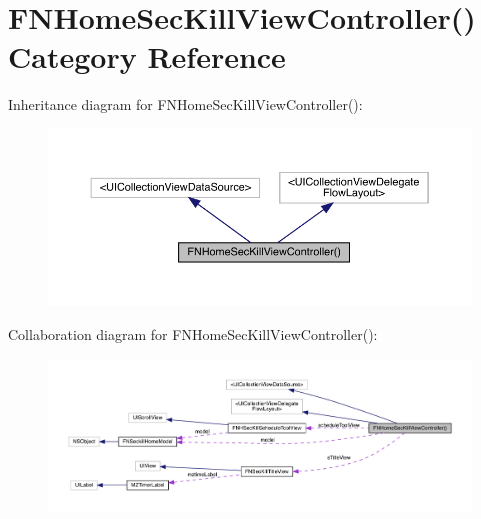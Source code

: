 \hypertarget{category_f_n_home_sec_kill_view_controller_07_08}{}\section{F\+N\+Home\+Sec\+Kill\+View\+Controller() Category Reference}
\label{category_f_n_home_sec_kill_view_controller_07_08}


Inheritance diagram for F\+N\+Home\+Sec\+Kill\+View\+Controller()\+:\nopagebreak
\begin{figure}[H]
\begin{center}
\leavevmode
\includegraphics[width=350pt]{category_f_n_home_sec_kill_view_controller_07_08__inherit__graph}
\end{center}
\end{figure}


Collaboration diagram for F\+N\+Home\+Sec\+Kill\+View\+Controller()\+:\nopagebreak
\begin{figure}[H]
\begin{center}
\leavevmode
\includegraphics[width=350pt]{category_f_n_home_sec_kill_view_controller_07_08__coll__graph}
\end{center}
\end{figure}
